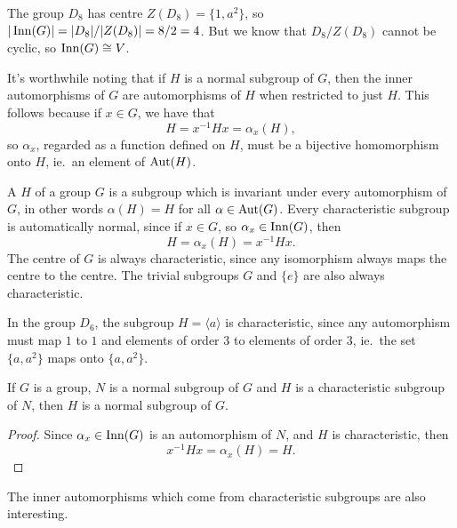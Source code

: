 \begin{example}
  The group $D_{8}$ has centre $Z(D_{8}) = \{1, a^{2}\}$, so $|\operatorname{Inn}(G)| =
  |D_{8}|/|Z(D_{8})| = 8/2 = 4$.  But we know that $D_{8}/Z(D_{8})$ cannot be
  cyclic, so $\operatorname{Inn}(G) \cong V$.
\end{example}

It's worthwhile noting that if $H$ is a normal subgroup of $G$, then the
inner automorphisms of $G$ are automorphisms of $H$ when restricted to just $H$.
This follows because if $x \in G$, we have that
\[
  H = x^{-1}Hx = \alpha_{x}(H),
\]
so $\alpha_{x}$, regarded as a function defined on $H$, must be a bijective
homomorphism onto $H$, ie.~an element of $\operatorname{Aut}(H)$.

A  $H$ of a group $G$
is a subgroup which is invariant under every automorphism of $G$, in other
words $\alpha(H) = H$ for all $\alpha \in \operatorname{Aut}(G)$.  Every characteristic
subgroup is automatically normal, since if $x \in G$, so $\alpha_{x} \in
\operatorname{Inn}(G)$, then
\[
  H = \alpha_{x}(H) = x^{-1}Hx.
\]
The centre of $G$ is always characteristic, since any isomorphism always
maps the centre to the centre.  The trivial subgroups $G$ and $\{e\}$ are also
always characteristic.

\begin{example}
  In the group $D_{6}$, the subgroup $H = \langle a \rangle$ is characteristic,
  since any automorphism must map $1$ to $1$ and elements of order $3$ to elements
  of order $3$, ie.~the set $\{a, a^{2}\}$ maps onto $\{a, a^{2}\}$.
\end{example}

\begin{proposition}
  If $G$ is a group, $N$ is a normal subgroup of $G$ and $H$ is a
  characteristic subgroup of $N$, then $H$ is a normal subgroup of $G$.
\end{proposition}
\begin{proof}
  Since $\alpha_{x} \in \operatorname{Inn}(G)$ is an automorphism of $N$, and $H$ is
  characteristic, then
  \[
    x^{-1}Hx = \alpha_{x}(H) = H.
  \]
\end{proof}

The inner automorphisms which come from characteristic subgroups are also
interesting.


